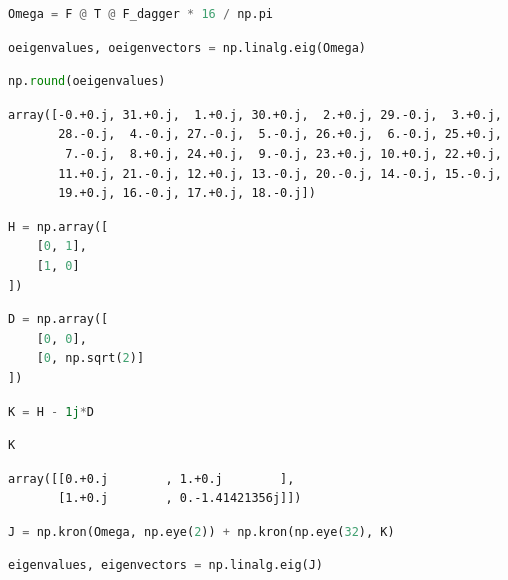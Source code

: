 \begin{lstlisting}[language=Python]
Omega = F @ T @ F_dagger * 16 / np.pi
\end{lstlisting}

\begin{lstlisting}[language=Python]
oeigenvalues, oeigenvectors = np.linalg.eig(Omega)
\end{lstlisting}

\begin{lstlisting}[language=Python]
np.round(oeigenvalues)
\end{lstlisting}

\begin{lstlisting}
array([-0.+0.j, 31.+0.j,  1.+0.j, 30.+0.j,  2.+0.j, 29.-0.j,  3.+0.j,
       28.-0.j,  4.-0.j, 27.-0.j,  5.-0.j, 26.+0.j,  6.-0.j, 25.+0.j,
        7.-0.j,  8.+0.j, 24.+0.j,  9.-0.j, 23.+0.j, 10.+0.j, 22.+0.j,
       11.+0.j, 21.-0.j, 12.+0.j, 13.-0.j, 20.-0.j, 14.-0.j, 15.-0.j,
       19.+0.j, 16.-0.j, 17.+0.j, 18.-0.j])
\end{lstlisting}

\begin{lstlisting}[language=Python]
H = np.array([
    [0, 1],
    [1, 0]
])
\end{lstlisting}

\begin{lstlisting}[language=Python]
D = np.array([
    [0, 0],
    [0, np.sqrt(2)]
])
\end{lstlisting}

\begin{lstlisting}[language=Python]
K = H - 1j*D
\end{lstlisting}

\begin{lstlisting}[language=Python]
K
\end{lstlisting}

\begin{lstlisting}
array([[0.+0.j        , 1.+0.j        ],
       [1.+0.j        , 0.-1.41421356j]])
\end{lstlisting}

\begin{lstlisting}[language=Python]
J = np.kron(Omega, np.eye(2)) + np.kron(np.eye(32), K)
\end{lstlisting}

\begin{lstlisting}[language=Python]
eigenvalues, eigenvectors = np.linalg.eig(J)
\end{lstlisting}

